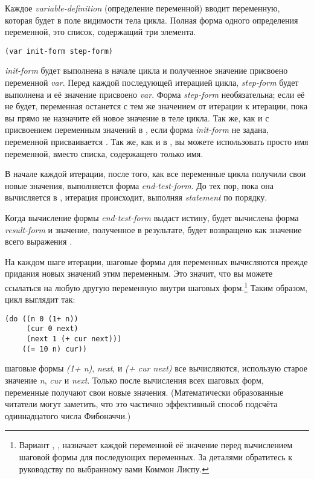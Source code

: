 Каждое \textit{variable-definition} (определение переменной) вводит переменную, которая
будет в поле видимости тела цикла. Полная форма одного определения переменной, это список,
содержащий три элемента.

\begin{lstlisting}
(var init-form step-form)
\end{lstlisting}

\textit{init-form} будет выполнена в начале цикла и полученное значение присвоено
переменной \textit{var}.  Перед каждой последующей итерацией цикла, \textit{step-form}
будет выполнена и её значение присвоено \textit{var}.  Форма \textit{step-form}
необязательна; если её не будет, переменная останется с тем же значением от итерации к
итерации, пока вы прямо не назначите ей новое значение в теле цикла. Так же, как и с
присвоением переменным значений в , если форма \textit{init-form} не задана,
переменной присваивается . Так же, как и в , вы можете использовать
просто имя переменной, вместо списка, содержащего только имя.

В начале каждой итерации, после того, как все переменные цикла получили свои новые
значения, выполняется форма \textit{end-test-form}. До тех пор, пока она вычисляется в
, итерация происходит, выполняя \textit{statement} по порядку.

Когда вычисление формы \textit{end-test-form} выдаст истину, будет вычислена форма
\textit{result-form} и значение, полученное в результате, будет возвращено как значение
всего выражения .

На каждом шаге итерации, шаговые формы для переменных вычисляются прежде придания новых
значений этим переменным. Это значит, что вы можете ссылаться на любую другую переменную
внутри шаговых форм.\footnote{Вариант , , назначает каждой переменной
  её значение перед вычислением шаговой формы для последующих переменных. За деталями
  обратитесь к руководству по выбранному вами Коммон Лиспу.} Таким образом, цикл выглядит
так:

\begin{lstlisting}
(do ((n 0 (1+ n))
     (cur 0 next)
     (next 1 (+ cur next)))
    ((= 10 n) cur))
\end{lstlisting}

шаговые формы \textit{(1+ n)}, \textit{next}, и \textit{(+ cur next)} все вычисляются,
использую старое значение \textit{n}, \textit{cur} и \textit{next}. Только после
вычисления всех шаговых форм, переменные получают свои новые значения. (Математически
образованные читатели могут заметить, что это частично эффективный способ подсчёта
одиннадцатого числа Фибоначчи.)

